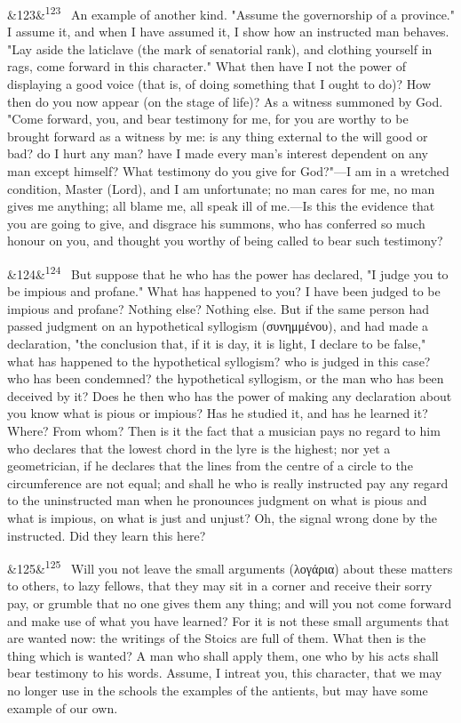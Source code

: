 \documentclass[12pt]{article}
\newcommand{\para}[1][]{\par\noindent\ifx&#1&\else\textsuperscript{\footnotesize #1}~\fi}
\begin{document}
\para[123] An example of another kind. "Assume the governorship of a province." I assume it, and when I have assumed it, I show how an instructed man behaves. "Lay aside the laticlave (the mark of senatorial rank), and clothing yourself in rags, come forward in this character." What then have I not the power of displaying a good voice (that is, of doing something that I ought to do)? How then do you now appear (on the stage of life)? As a witness summoned by God. "Come forward, you, and bear testimony for me, for you are worthy to be brought forward as a witness by me: is any thing external to the will good or bad? do I hurt any man? have I made every man's interest dependent on any man except himself? What testimony do you give for God?"—I am in a wretched condition, Master (Lord), and I am unfortunate; no man cares for me, no man gives me anything; all blame me, all speak ill of me.—Is this the evidence that you are going to give, and disgrace his summons, who has conferred so much honour on you, and thought you worthy of being called to bear such testimony?

\para[124] But suppose that he who has the power has declared, "I judge you to be impious and profane." What has happened to you? I have been judged to be impious and profane? Nothing else? Nothing else. But if the same person had passed judgment on an hypothetical syllogism (συνημμένου), and had made a declaration, "the conclusion that, if it is day, it is light, I declare to be false," what has happened to the hypothetical syllogism? who is judged in this case? who has been condemned? the hypothetical syllogism, or the man who has been deceived by it? Does he then who has the power of making any declaration about you know what is pious or impious? Has he studied it, and has he learned it? Where? From whom? Then is it the fact that a musician pays no regard to him who declares that the lowest chord in the lyre is the highest; nor yet a geometrician, if he declares that the lines from the centre of a circle to the circumference are not equal; and shall he who is really instructed pay any regard to the uninstructed man when he pronounces judgment on what is pious and what is impious, on what is just and unjust? Oh, the signal wrong done by the instructed. Did they learn this here?

\para[125] Will you not leave the small arguments (λογάρια) about these matters to others, to lazy fellows, that they may sit in a corner and receive their sorry pay, or grumble that no one gives them any thing; and will you not come forward and make use of what you have learned? For it is not these small arguments that are wanted now: the writings of the Stoics are full of them. What then is the thing which is wanted? A man who shall apply them, one who by his acts shall bear testimony to his words. Assume, I intreat you, this character, that we may no longer use in the schools the examples of the antients, but may have some example of our own.
\end{document}
